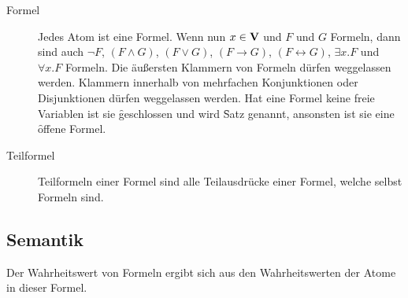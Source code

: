 \begin{description}
        \item[Formel] Jedes Atom ist eine Formel. Wenn nun $x\in\textbf{V}$ und $F$ und $G$ Formeln, dann sind auch $\neg F$, $(F\land G)$, $(F\lor G)$, $(F\to G)$, $(F\leftrightarrow G)$, $\exists x.F$ und $\forall x.F$ Formeln. Die äußersten Klammern von Formeln dürfen weggelassen werden. Klammern innerhalb von mehrfachen Konjunktionen oder Disjunktionen dürfen weggelassen werden. Hat eine Formel keine freie Variablen ist sie \f{geschlossen} und wird \f{Satz} genannt, ansonsten ist sie eine \f{offene} Formel.

        \item[Teilformel] Teilformeln einer Formel sind alle Teilausdrücke einer Formel, welche selbst Formeln sind.
    \end{description}


\subsection{Semantik}
    Der Wahrheitswert von Formeln ergibt sich aus den Wahrheitswerten der Atome in dieser Formel. 
